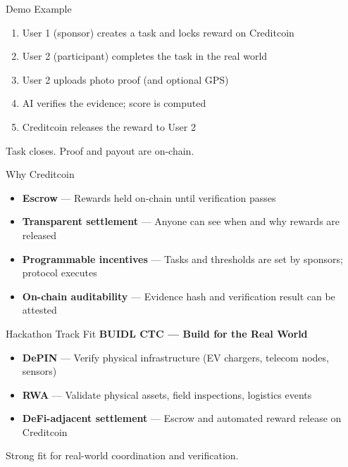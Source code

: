 \documentclass[11pt]{beamer}
\begin{document}
\begin{frame}{Demo Example}
\begin{enumerate}
\item User 1 (sponsor) creates a task and locks reward on Creditcoin
\item User 2 (participant) completes the task in the real world
\item User 2 uploads photo proof (and optional GPS)
\item AI verifies the evidence; score is computed
\item Creditcoin releases the reward to User 2
\end{enumerate}
\vspace{0.5em}
Task closes. Proof and payout are on-chain.
\end{frame}

\begin{frame}{Why Creditcoin}
\begin{itemize}
\item \textbf{Escrow} — Rewards held on-chain until verification passes
\item \textbf{Transparent settlement} — Anyone can see when and why rewards are released
\item \textbf{Programmable incentives} — Tasks and thresholds are set by sponsors; protocol executes
\item \textbf{On-chain auditability} — Evidence hash and verification result can be attested
\end{itemize}
\end{frame}

\begin{frame}{Hackathon Track Fit}
\textbf{BUIDL CTC — Build for the Real World}
\vspace{0.5em}
\begin{itemize}
\item \textbf{DePIN} — Verify physical infrastructure (EV chargers, telecom nodes, sensors)
\item \textbf{RWA} — Validate physical assets, field inspections, logistics events
\item \textbf{DeFi-adjacent settlement} — Escrow and automated reward release on Creditcoin
\end{itemize}
\vspace{0.5em}
Strong fit for real-world coordination and verification.
\end{frame}
\end{document}
